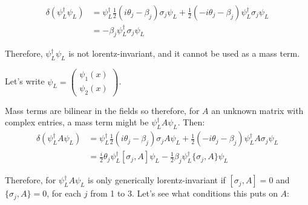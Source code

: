 \documentclass{article}
\begin{document}
\begin{align}
\delta( \psi_{L}^\dagger \psi_{L}) & =
	\psi_{L}^\dagger \frac12 (i \theta_j - \beta_j) \sigma_j \psi_{L}
	+ \frac12(-i \theta_j - \beta_j) \psi_{L}^\dagger \sigma_j \psi_{L} \nonumber \\
& = - \beta_j \psi_{L}^\dagger \sigma_j \psi_{L}
\end{align}

Therefore, $\psi_L^\dagger \psi_L$ is not lorentz-invariant, and it cannot
	be used as a mass term.

Let's write $\psi_L 
	= \left( \begin{matrix} \psi_1(x) \\ \psi_2(x) \end{matrix} \right)$.

Mass terms are bilinear in the fields  so therefore, for $A$ an unknown
	matrix with complex entries, a mass term might be $\psi_L^\dagger A \psi_L$.
Then: 
\begin{align}
\delta ( \psi_L^\dagger A \psi_L)
	& = 
	\psi_{L}^\dagger \frac12 (i \theta_j - \beta_j) \sigma_j A \psi_{L}
	+ \frac12(-i \theta_j - \beta_j) \psi_{L}^\dagger A \sigma_j \psi_{L} \nonumber \\
& = \frac i2 \theta_j \psi_L^\dagger [ \sigma_j, A ] \psi_L
- \frac12 \beta_j \psi_{L}^\dagger \{ \sigma_j, A \} \psi_{L}
\end{align}

Therefore, for $\psi_L^\dagger A \psi_L$ is only generically lorentz-invariant
	if $[ \sigma_j, A ] = 0$ and $\{ \sigma_j, A \} = 0$, for each $j$ from 1 to 3.
Let's see what conditions this puts on $A$:
\end{document}
